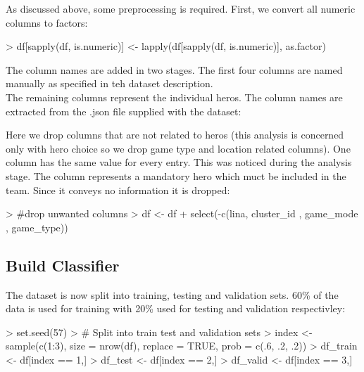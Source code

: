 \documentclass[10pt]{article}
\begin{document}
As discussed above, some preprocessing is required. First, we convert all numeric columns to factors:
\begin{Schunk}
\begin{Sinput}
> df[sapply(df, is.numeric)] <- lapply(df[sapply(df, is.numeric)], as.factor)
\end{Sinput}
\end{Schunk}

The column names are added in two stages. The first four columns are named manually as specified in teh dataset description.\\
The remaining columns represent the individual heros. The column names are extracted from the .json file supplied with the dataset:
\begin{Schunk}
\end{Schunk}


Here we drop columns that are not related to heros (this analysis is concerned only with hero choice so we drop game type and location related columns). 
One column has the same value for every entry. This was noticed during the analysis stage. The column represents a mandatory hero which muct be included in the team. Since it conveys no information it is dropped:
\begin{Schunk}
\begin{Sinput}
> #drop unwanted columns
> df <- df%
+   select(-c(lina, cluster_id , game_mode , game_type))
\end{Sinput}
\end{Schunk}




\subsection{Build Classifier}
The dataset is now split into training, testing and validation sets. 60\% of the data is used for training with 20\% used for testing and validation respectivley:
\begin{Schunk}
\begin{Sinput}
> set.seed(57)
> # Split into train test and validation sets
> index <- sample(c(1:3), size = nrow(df), replace = TRUE, prob = c(.6, .2, .2))
> df_train <- df[index == 1,]
> df_test <- df[index == 2,]
> df_valid <- df[index == 3,]
\end{Sinput}
\end{Schunk}
\end{document}
